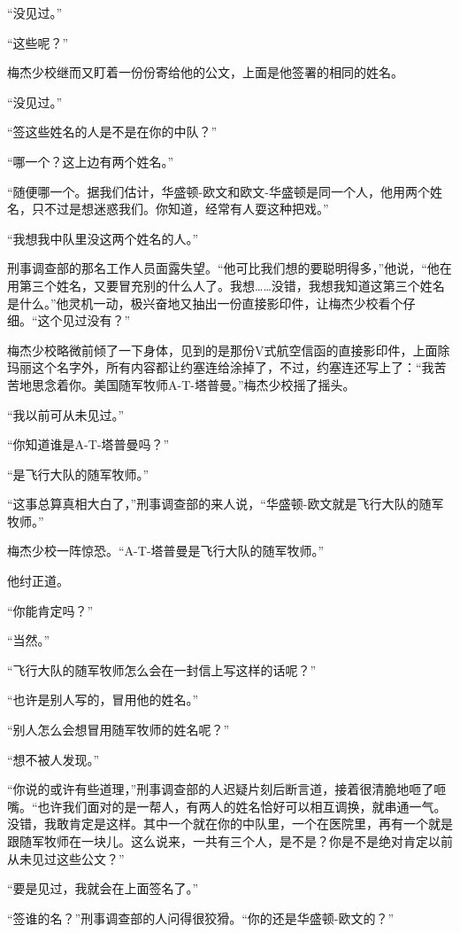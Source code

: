     “没见过。”

    “这些呢？”

    梅杰少校继而又盯着一份份寄给他的公文，上面是他签署的相同的姓名。

    “没见过。”

    “签这些姓名的人是不是在你的中队？”

    “哪一个？这上边有两个姓名。”

    “随便哪一个。据我们估计，华盛顿-欧文和欧文-华盛顿是同一个人，他用两个姓名，只不过是想迷惑我们。你知道，经常有人耍这种把戏。”

    “我想我中队里没这两个姓名的人。”

    刑事调查部的那名工作人员面露失望。“他可比我们想的要聪明得多，”他说，“他在用第三个姓名，又要冒充别的什么人了。我想……没错，我想我知道这第三个姓名是什么。”他灵机一动，极兴奋地又抽出一份直接影印件，让梅杰少校看个仔细。“这个见过没有？”

    梅杰少校略微前倾了一下身体，见到的是那份V式航空信函的直接影印件，上面除玛丽这个名字外，所有内容都让约塞连给涂掉了，不过，约塞连还写上了：“我苦苦地思念着你。美国随军牧师A-T-塔普曼。”梅杰少校摇了摇头。

    “我以前可从未见过。”

    “你知道谁是A-T-塔普曼吗？”

    “是飞行大队的随军牧师。”

    “这事总算真相大白了，”刑事调查部的来人说，“华盛顿-欧文就是飞行大队的随军牧师。”

    梅杰少校一阵惊恐。“A-T-塔普曼是飞行大队的随军牧师。”

    他纣正道。

    “你能肯定吗？”

    “当然。”

    “飞行大队的随军牧师怎么会在一封信上写这样的话呢？”

    “也许是别人写的，冒用他的姓名。”

    “别人怎么会想冒用随军牧师的姓名呢？”

    “想不被人发现。”

    “你说的或许有些道理，”刑事调查部的人迟疑片刻后断言道，接着很清脆地咂了咂嘴。“也许我们面对的是一帮人，有两人的姓名恰好可以相互调换，就串通一气。没错，我敢肯定是这样。其中一个就在你的中队里，一个在医院里，再有一个就是跟随军牧师在一块儿。这么说来，一共有三个人，是不是？你是不是绝对肯定以前从未见过这些公文？”

    “要是见过，我就会在上面签名了。”

    “签谁的名？”刑事调查部的人问得很狡猾。“你的还是华盛顿-欧文的？”

